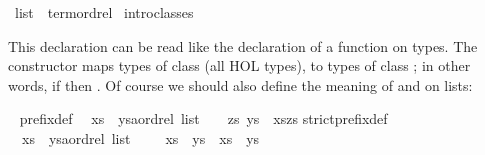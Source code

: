 %
\begin{isabellebody}%
\def\isabellecontext{Overloading}%
\isamarkupfalse%
\ list\ {\isacharcolon}{\isacharcolon}\ {\isacharparenleft}{\isachardoublequote}term{\isachardoublequote}{\isacharparenright}ordrel\isanewline
\isamarkupfalse%
\ intro{\isacharunderscore}classes\isamarkupfalse%
%
\begin{isamarkuptext}%
\noindent
This  declaration can be read like the declaration of
a function on types.  The constructor  maps types of class  (all HOL types), to types of class ;
in other words,
if  then .
Of course we should also define the meaning of \isa{{\isacharless}{\isacharless}{\isacharequal}} and
\isa{{\isacharless}{\isacharless}} on lists:%
\end{isamarkuptext}%
\isamarkuptrue%
\ {\isacharparenleft}\isanewline
prefix{\isacharunderscore}def{\isacharcolon}\isanewline
\ \ {\isachardoublequote}xs\ {\isacharless}{\isacharless}{\isacharequal}\ {\isacharparenleft}ys{\isacharcolon}{\isacharcolon}{\isacharprime}a{\isacharcolon}{\isacharcolon}ordrel\ list{\isacharparenright}\ \ {\isasymequiv}\ \ {\isasymexists}zs{\isachardot}\ ys\ {\isacharequal}\ xs{\isacharat}zs{\isachardoublequote}\isanewline
strict{\isacharunderscore}prefix{\isacharunderscore}def{\isacharcolon}\isanewline
\ \ {\isachardoublequote}xs\ {\isacharless}{\isacharless}\ {\isacharparenleft}ys{\isacharcolon}{\isacharcolon}{\isacharprime}a{\isacharcolon}{\isacharcolon}ordrel\ list{\isacharparenright}\ \ \ {\isasymequiv}\ \ xs\ {\isacharless}{\isacharless}{\isacharequal}\ ys\ {\isasymand}\ xs\ {\isasymnoteq}\ ys{\isachardoublequote}\isamarkupfalse%
\isamarkupfalse%
\end{isabellebody}%
